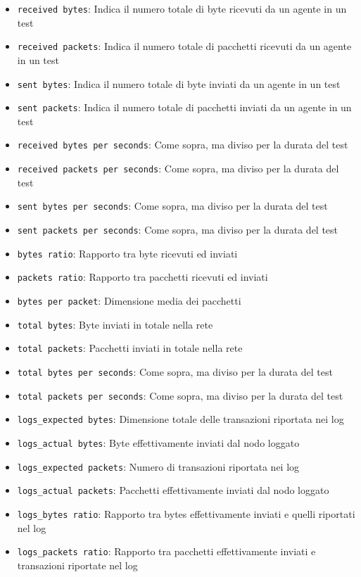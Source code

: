 \documentclass[12pt, a4paper]{article}
\begin{document}
\begin{itemize}
    \item \lstinline{received bytes}: Indica il numero totale di byte ricevuti da un agente in un test
    \item \lstinline{received packets}: Indica il numero totale di pacchetti ricevuti da un agente in un test
    \item \lstinline{sent bytes}: Indica il numero totale di byte inviati da un agente in un test
    \item \lstinline{sent packets}: Indica il numero totale di pacchetti inviati da un agente in un test
    \item \lstinline{received bytes per seconds}: Come sopra, ma diviso per la durata del test
    \item \lstinline{received packets per seconds}: Come sopra, ma diviso per la durata del test
    \item \lstinline{sent bytes per seconds}: Come sopra, ma diviso per la durata del test
    \item \lstinline{sent packets per seconds}: Come sopra, ma diviso per la durata del test
    \item \lstinline{bytes ratio}: Rapporto tra byte ricevuti ed inviati
    \item \lstinline{packets ratio}: Rapporto tra pacchetti ricevuti ed inviati
    \item \lstinline{bytes per packet}: Dimensione media dei pacchetti
    \item \lstinline{total bytes}: Byte inviati in totale nella rete
    \item \lstinline{total packets}: Pacchetti inviati in totale nella rete
    \item \lstinline{total bytes per seconds}: Come sopra, ma diviso per la durata del test
    \item \lstinline{total packets per seconds}: Come sopra, ma diviso per la durata del test
    \item \lstinline{logs_expected bytes}: Dimensione totale delle transazioni riportata nei log
    \item \lstinline{logs_actual bytes}: Byte effettivamente inviati dal nodo loggato
    \item \lstinline{logs_expected packets}: Numero di transazioni riportata nei log
    \item \lstinline{logs_actual packets}: Pacchetti effettivamente inviati dal nodo loggato
    \item \lstinline{logs_bytes ratio}: Rapporto tra bytes effettivamente inviati e quelli riportati nel log
    \item \lstinline{logs_packets ratio}: Rapporto tra pacchetti effettivamente inviati e transazioni riportate nel log
\end{itemize}
\end{document}

